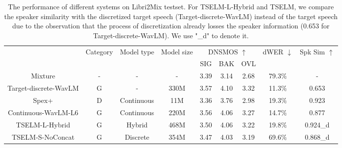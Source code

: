 \documentclass[conference]{IEEEtran}
\begin{document}
\begin{table}
    \caption{The performance of different systems on Libri2Mix testset. For TSELM-L-Hybrid  
    and TSELM, we compare the speaker similarity with the discretized target speech 
    (Target-discrete-WavLM) instead of the target speech due to the observation that 
    the process of discretization already losses the speaker information (0.653 for 
    Target-discrete-WavLM). We use "\_d" to denote it.  }
    \setlength{\tabcolsep}{12pt} %
    \renewcommand{\arraystretch}{1.3}
    \begin{center}
        \begin{tabular}{ccccccccc}
            \Xhline{2\arrayrulewidth} %
            \multirow{2}{*}{System} & \multirow{2}{*}{Category} & \multirow{2}{*}{Model type} & \multirow{2}{*}{Model size} & \multicolumn{3}{c}{ DNSMOS $\uparrow$} & \multirow{2}{*}{dWER $\downarrow$} & \multirow{2}{*}{Spk Sim $\uparrow$} \\
            \cline{5-7}
              &                   &                             &                             & SIG     & BAK     & OVL    &                       &                          \\ 
            \hline
            Mixture                 & - & -                           & -                           & 3.39    & 3.14    & 2.68   & 79.3\%                & -                        \\
            Target-discrete-WavLM   & G & -                          & 330M                           & 3.57    & 4.10    & 3.32   & 11.3\%                & 0.653                    \\
            \hline
            Spex+                   &  D & Continuous                  & 11M                         & 3.36    & 3.76    & 2.98   & 19.3\%                & 0.923                    \\
            \hline
            Continuous-WavLM-L6   & G    & Continuous                  & 220M                        & 3.56    & 4.06    & 3.27   & 14.7\%                & 0.877                    \\
            TSELM-L-Hybrid    & G       & Hybrid                      & 468M                        & 3.50    & 4.06    & 3.22   & 19.8\%                & 0.924\_d                 \\
            TSELM-S-NoConcat           & G       & Discrete                    & 354M                        & 3.47    & 4.03    & 3.19   & 69.6\%                & 0.868\_d                 \\

\end{tabular}
\end{center}
\end{table}
\end{document}
